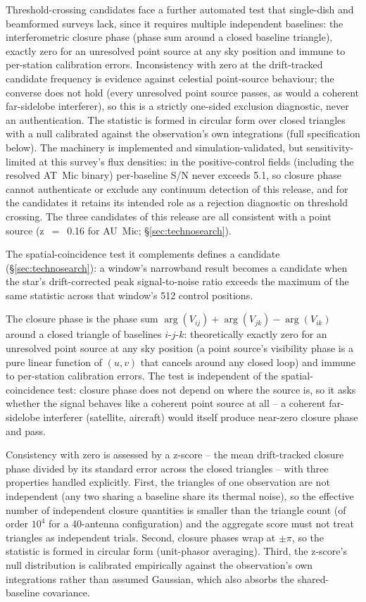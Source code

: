 \documentclass{openjournal}
\begin{document}
Threshold-crossing candidates face a further automated test that
single-dish and beamformed surveys lack, since it requires multiple
independent baselines: the interferometric closure phase (phase sum
around a closed baseline triangle), exactly zero for an unresolved
point source at any sky position and immune to per-station
calibration errors. Inconsistency with zero at the drift-tracked
candidate frequency is evidence against celestial point-source
behaviour; the converse does not hold (every unresolved point source
passes, as would a coherent far-sidelobe interferer), so this is a
strictly one-sided exclusion diagnostic, never an authentication. The
statistic is formed in circular form over closed triangles with a
null calibrated against the observation's own integrations
(full specification below). The machinery is implemented and
simulation-validated, but sensitivity-limited at this survey's flux
densities: in the positive-control fields (including the resolved
AT~Mic binary) per-baseline S/N never exceeds 5.1, so closure phase
cannot authenticate or exclude any continuum detection of this
release, and for the candidates it retains its intended role as a
rejection diagnostic on threshold crossing. The three candidates of
this release are all consistent with a point source (z~$=$~0.16 for
AU~Mic; \S\ref{sec:technosearch}).

The spatial-coincidence test it complements defines a candidate
(\S\ref{sec:technosearch}): a window's narrowband result becomes a
candidate when the star's drift-corrected peak signal-to-noise ratio
exceeds the maximum of the same statistic across that window's 512
control positions.

The closure phase is the phase sum
$\arg(V_{ij}) + \arg(V_{jk}) - \arg(V_{ik})$ around a closed triangle
of baselines $i$-$j$-$k$: theoretically exactly zero for an unresolved
point source at any sky position (a point source's visibility phase is
a pure linear function of $(u,v)$ that cancels around any closed
loop) and immune to per-station calibration errors. The test is
independent of the spatial-coincidence test: closure phase does not
depend on where the source is, so it asks whether the signal behaves
like a coherent point source at all -- a coherent far-sidelobe
interferer (satellite, aircraft) would itself produce near-zero
closure phase and pass.

Consistency with zero is assessed by a z-score -- the mean
drift-tracked closure phase divided by its standard error across the
closed triangles -- with three properties handled explicitly. First,
the triangles of one observation are not independent (any two sharing
a baseline share its thermal noise), so the effective number of
independent closure quantities is smaller than the triangle count (of
order $10^{4}$ for a 40-antenna configuration) and the aggregate
score must not treat triangles as independent trials. Second, closure
phases wrap at $\pm\pi$, so the statistic is formed in circular form
(unit-phasor averaging). Third, the z-score's null distribution is
calibrated empirically against the observation's own integrations
rather than assumed Gaussian, which also absorbs the shared-baseline
covariance.
\end{document}
